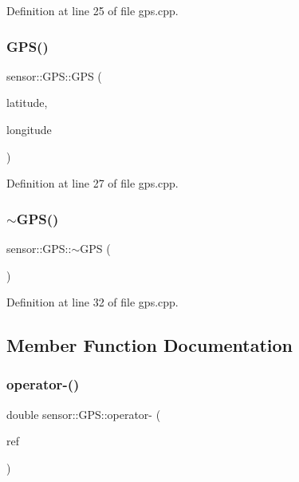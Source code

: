 Definition at line 25 of file gps.\+cpp.

\mbox{\label{classsensor_1_1_g_p_s_a14837a509a3f16ebdd2f2ba5088f9b3f}} 
\subsubsection{\texorpdfstring{G\+P\+S()}{GPS()}\hspace{0.1cm}{\footnotesize\ttfamily [2/2]}}
{\footnotesize\ttfamily sensor\+::\+G\+P\+S\+::\+G\+PS (\begin{DoxyParamCaption}\item[{std\+::string}]{latitude,  }\item[{std\+::string}]{longitude }\end{DoxyParamCaption})}



Definition at line 27 of file gps.\+cpp.

\mbox{\label{classsensor_1_1_g_p_s_a40c60af10a932120408155ca430cbe34}} 
\subsubsection{\texorpdfstring{$\sim$\+G\+P\+S()}{~GPS()}}
{\footnotesize\ttfamily sensor\+::\+G\+P\+S\+::$\sim$\+G\+PS (\begin{DoxyParamCaption}{ }\end{DoxyParamCaption})}



Definition at line 32 of file gps.\+cpp.



\subsection{Member Function Documentation}
\mbox{\label{classsensor_1_1_g_p_s_a5d2f338838b59c6e980ff96bf5bc8087}} 
\subsubsection{\texorpdfstring{operator-\/()}{operator-()}}
{\footnotesize\ttfamily double sensor\+::\+G\+P\+S\+::operator-\/ (\begin{DoxyParamCaption}\item[{\hyperlink{classsensor_1_1_g_p_s}{G\+PS} \&}]{ref }\end{DoxyParamCaption})}



